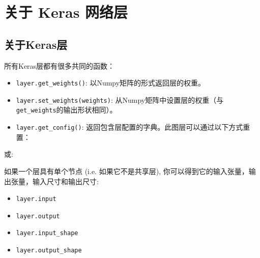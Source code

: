 \section{关于 Keras 网络层}\label{ux5173ux4e8ekerasux5c42}
\subsection{关于Keras层}
所有Keras层都有很多共同的函数：

\begin{itemize}
\tightlist
\item
  \texttt{layer.get\_weights()}: 以Numpy矩阵的形式返回层的权重。
\item
  \texttt{layer.set\_weights(weights)}:
  从Numpy矩阵中设置层的权重（与\texttt{get\_weights}的输出形状相同）。
\item
  \texttt{layer.get\_config()}:
  返回包含层配置的字典。此图层可以通过以下方式重置：
\end{itemize}

\begin{Shaded}
\begin{Highlighting}[]
\OperatorTok{=} \NormalTok{)}
\OperatorTok{=} 
\OperatorTok{=} 
\end{Highlighting}
\end{Shaded}

或:

\begin{Shaded}
\begin{Highlighting}[]
  

\OperatorTok{=} 
\OperatorTok{=} \NormalTok{,}
\end{Highlighting}
\end{Shaded}

如果一个层具有单个节点 (i.e. 如果它不是共享层),
你可以得到它的输入张量，输出张量，输入尺寸和输出尺寸:

\begin{itemize}
\tightlist
\item
  \texttt{layer.input}
\item
  \texttt{layer.output}
\item
  \texttt{layer.input\_shape}
\item
  \texttt{layer.output\_shape}
\end{itemize}

